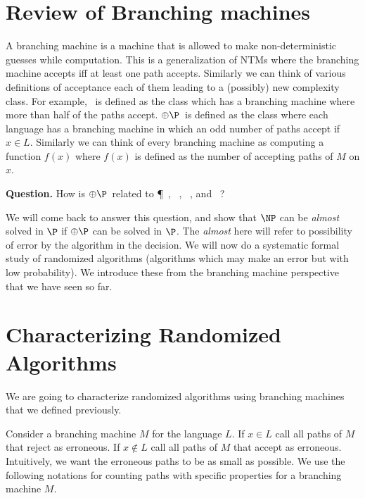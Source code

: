 

\newcommand{\paths}[2]{\ensuremath{\#paths_{M}(x)}}
\newcommand{\acc}[2]{\ensuremath{\#acc_{M}(x)}}
\newcommand{\rej}[2]{\ensuremath{\#rej_{M}(x)}}
\newcommand{\err}[2]{\ensuremath{\#err_{M}(x)}}

\newcommand{\ParityP}{\ensuremath{\oplus\P}}




\section{Review of Branching machines}

A branching machine is a machine that is allowed to make non-deterministic guesses while computation. This is 
a generalization of NTMs where the branching machine accepts iff at least one path accepts. Similarly we can think of 
various definitions of acceptance each of them leading to a (possibly) new complexity class. For example, \PP\ is defined as the class 
which has a branching machine where more than half of the paths accept. \ParityP\ is defined as the class where each language has a 
branching machine in which an odd number of paths accept if $x \in L$. Similarly we can think of every branching machine as computing 
a function $f(x)$ where $f(x)$ is defined as the number of accepting paths of $M$ on $x$.

\textbf{Question. } How is \ParityP\ related to \P\ , \NP\ , \PSPACE\ , and \PP\ ?

We will come back to answer this question, and show that $\NP$ can be
{\em almost} solved in $\P$ if $\ParityP$ can be solved in $\P$. The
{\em almost} here will refer to possibility of error by the algorithm
in the decision. We will now do a systematic formal study of
randomized algorithms (algorithms which may make an error but with low
probability). We introduce these from the branching machine
perspective that we have seen so far.

\section{Characterizing Randomized Algorithms}

We are going to characterize randomized algorithms using branching machines that we 
defined previously.

Consider a branching machine $M$ for the language $L$. If $x \in L$ call all paths of $M$ that 
reject as erroneous. If $x \notin L$ call all paths of $M$ that accept as erroneous. Intuitively, 
we want the erroneous paths to be as small as possible. We use the following notations for counting 
paths with specific properties for a branching machine $M$.

